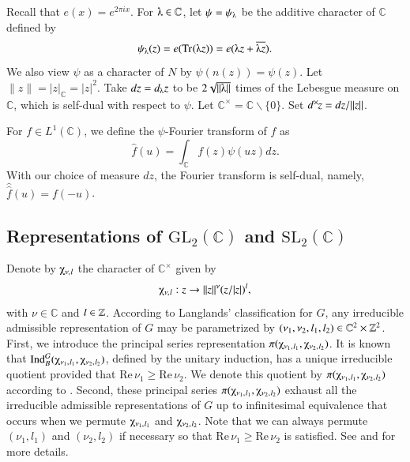 \documentclass{amsproc}
\newcommand{\BC}{{\mathbb {C}}} \newcommand{\BD}{{\mathbb {D}}}
\newcommand{\GL}{{\mathrm {GL}}} \newcommand{\PGL}{{\mathrm {PGL}}}
\newcommand{\SL}{{\mathrm {SL}}} \newcommand{\PSL}{{\mathrm {PSL}}}
\newcommand{\ra}{\rightarrow}
\def\BCx{\BC^{\times}}
\renewcommand{\Re}{{\mathrm{Re}\,}}
\def\shskip{\hskip 0.5 pt}
\def\dx{d^{\times} \hskip -1 pt}
\theoremstyle{plain}
\numberwithin{equation}{section}
\begin{document}
	Recall that $e (x) = e^{2 \pi i x}$. For $\lambdaup \in \BC$, let  $\psi = \psi_{\lambdaup}$ be   the additive
	character of $\BC$ defined by $$ \psi_{\lambdaup} (z)=e (\Tr \shskip (\lambdaup z)) = e (\lambdaup z + \overline {\lambdaup z}).$$ %
	 We also view $\psi$ as a character of $N$ by $\psi(n(z))=\psi(z)$.  Let $\|z\| = |z|_{\BC}= |z|^2$. Take  $dz = d_{\lambdaup} z$  to be $2 \sqrt { \|\lambdaup\|}$ times of the Lebesgue measure on $\BC$, which is self-dual with
	respect to $\psi$. Let $\BCx = \BC \smallsetminus \{0\}$. 
	Set $\dx  z=dz/\|z\| $.


   For $f\in L^1(\BC )$, we define the $\psi$-Fourier transform of $f$ as
   \begin{equation}\label{def: Fourier}
   \widehat f(u)= \int_\BC f(z)\psi(uz)dz.
   \end{equation}
   With our choice of  measure $d z$, the Fourier transform is self-dual, namely,  $\widehat  {\widehat f } (u) = f (-u)$.  
   
   
   

\subsection{Representations of $\GL_2 (\BC)$ and $\SL_2 (\BC)$}\label{sec: representations of G and S}


	
 Denote by $\chiup_{\nu,\shskip l} $   the character of $\BCx$ given by
   \begin{align*}
    \chiup_{\nu,\shskip  l} : z \ra \|z\|^{  \nu} (z/|z|)^{l},
   \end{align*}
   with $\nu \in \BC$ and $ l \in {\mathbb {Z}} $.  According to Langlands' classification for $G$, any irreducible admissible representation of $G  $ may be parametrized by $(\nu_1, \nu_2, l_1, l_2) \in \BC^2 \times \BZ^2$. First, we introduce the principal series representation $\pi (\chiup_{\nu_1, \shskip l_1}, \chiup_{\nu_2,\shskip l_2})$. It is known that $\mathrm{Ind}_B^G (\chiup_{\nu_1, \shskip l_1}, \chiup_{\nu_2,\shskip l_2}) $, defined by the unitary induction, has a unique irreducible quotient provided that  $\Re \nu_1 \geqslant \Re \nu_2$. We denote this quotient by $\pi (\chiup_{\nu_1, \shskip l_1}, \chiup_{\nu_2,\shskip l_2})$ according to \cite[\S 6]{J-L}. Second, these principal series $\pi (\chiup_{\nu_1, \shskip l_1}, \chiup_{\nu_2,\shskip l_2})$ exhaust all the irreducible admissible representations of $G$ up to infinitesimal equivalence that occurs when we permute $ \chiup_{\nu_1, \shskip l_1}$ and $ \chiup_{\nu_2,\shskip  l_2}$. Note that we can always permute $( \nu_1, l_1 )$ and $(\nu_2, l_2)$ if necessary so that $\Re \nu_1 \geqslant \Re \nu_2$ is satisfied.  See \cite[\S 4]{Knapp} and  \cite[\S 6]{J-L} for more details.
\end{document}
